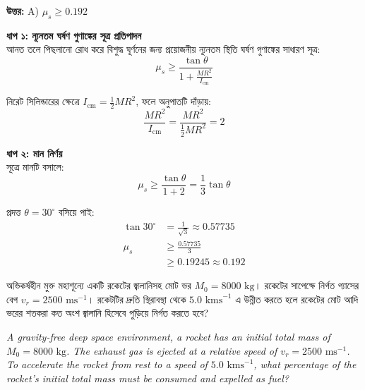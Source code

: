 \documentclass[12pt, a4paper]{article}
\begin{document}
\vspace{0.5em}
\begin{tcolorbox}[answerbox]
    \textbf{\color{success} উত্তর:} A) $\mu_s \ge 0.192$
\end{tcolorbox}
\vspace{1em}

\begin{tcolorbox}[solutionbox={সমাধান (Solution)}]
    \noindent
    \textbf{ধাপ ১: ন্যূনতম ঘর্ষণ গুণাঙ্কের সূত্র প্রতিপাদন} \\
    আনত তলে পিছলানো রোধ করে বিশুদ্ধ ঘূর্ণনের জন্য প্রয়োজনীয় ন্যূনতম স্থিতি ঘর্ষণ গুণাঙ্কের সাধারণ সূত্র:
    \[ \mu_s \ge \frac{\tan\theta}{1 + \frac{M R^2}{I_{\text{cm}}}} \]
    
    নিরেট সিলিন্ডারের ক্ষেত্রে $I_{\text{cm}} = \frac{1}{2} M R^2$, ফলে অনুপাতটি দাঁড়ায়:
    \[ \frac{M R^2}{I_{\text{cm}}} = \frac{M R^2}{\frac{1}{2} M R^2} = 2 \]
    
    \vspace{0.5em}
    \noindent\textbf{ধাপ ২: মান নির্ণয়} \\
    সূত্রে মানটি বসালে:
    \[ \mu_s \ge \frac{\tan\theta}{1 + 2} = \frac{1}{3} \tan\theta \]
    
    প্রদত্ত $\theta = 30^\circ$ বসিয়ে পাই:
    \begin{align*}
        \tan 30^\circ &= \frac{1}{\sqrt{3}} \approx 0.57735 \\
        \mu_s &\ge \frac{0.57735}{3} \\
              &\ge \mathbf{0.19245} \approx \mathbf{0.192}
    \end{align*}
\end{tcolorbox}

\newpage
\begin{tcolorbox}[questionbox={প্রশ্ন (Question) 50}]
    \noindent
    অভিকর্ষহীন মুক্ত মহাশূন্যে একটি রকেটের জ্বালানিসহ মোট ভর $M_0 = 8000\text{ kg}$। রকেটের সাপেক্ষে নির্গত গ্যাসের বেগ $v_r = 2500\text{ ms}^{-1}$। রকেটটির দ্রুতি স্থিরাবস্থা থেকে $5.0\text{ kms}^{-1}$ এ উন্নীত করতে হলে রকেটের মোট আদি ভরের শতকরা কত অংশ জ্বালানি হিসেবে পুড়িয়ে নির্গত করতে হবে?
    
    \vspace{0.8em}
    \begin{english}
    \noindent\textit{\color{darkgray}
    A gravity-free deep space environment, a rocket has an initial total mass of $M_0 = 8000\text{ kg}$. The exhaust gas is ejected at a relative speed of $v_r = 2500\text{ ms}^{-1}$. To accelerate the rocket from rest to a speed of $5.0\text{ kms}^{-1}$, what percentage of the rocket's initial total mass must be consumed and expelled as fuel?
    }
    \end{english}
\end{tcolorbox}
\end{document}
